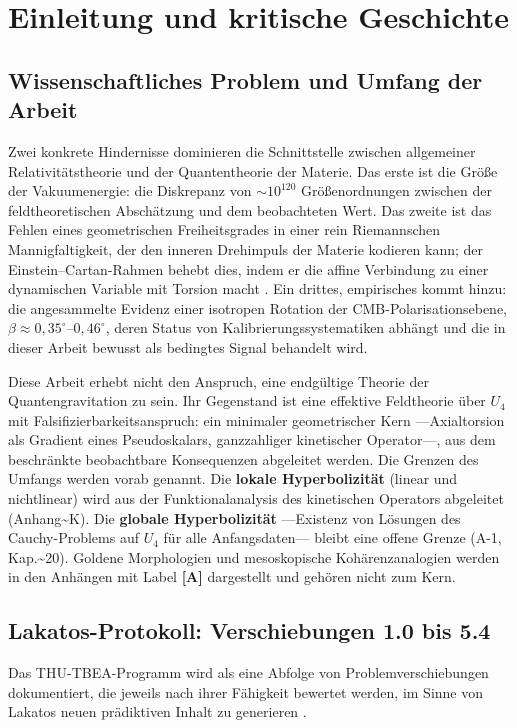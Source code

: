 ﻿\documentclass[11pt,letterpaper]{article}
\begin{document}
\newpage

\section{Einleitung und kritische Geschichte}
\subsection{Wissenschaftliches Problem und Umfang der Arbeit}
Zwei konkrete Hindernisse dominieren die Schnittstelle zwischen allgemeiner Relativitätstheorie und der Quantentheorie der Materie. Das erste ist die Größe der Vakuumenergie: die Diskrepanz von $\sim 10^{120}$ Größenordnungen zwischen der feldtheoretischen Abschätzung und dem beobachteten Wert. Das zweite ist das Fehlen eines geometrischen Freiheitsgrades in einer rein Riemannschen Mannigfaltigkeit, der den inneren Drehimpuls der Materie kodieren kann; der Einstein--Cartan-Rahmen behebt dies, indem er die affine Verbindung zu einer dynamischen Variable mit Torsion macht \cite{Hehl1976}. Ein drittes, empirisches kommt hinzu: die angesammelte Evidenz einer isotropen Rotation der CMB-Polarisationsebene, $\beta \approx 0{,}35^\circ$--$0{,}46^\circ$, deren Status von Kalibrierungssystematiken abhängt und die in dieser Arbeit bewusst als bedingtes Signal behandelt wird.

Diese Arbeit erhebt nicht den Anspruch, eine endgültige Theorie der Quantengravitation zu sein. Ihr Gegenstand ist eine effektive Feldtheorie über $U_4$ mit Falsifizierbarkeitsanspruch: ein minimaler geometrischer Kern ---Axialtorsion als Gradient eines Pseudoskalars, ganzzahliger kinetischer Operator---, aus dem beschränkte beobachtbare Konsequenzen abgeleitet werden. Die Grenzen des Umfangs werden vorab genannt. Die \textbf{lokale Hyperbolizität} (linear und nichtlinear) wird aus der Funktionalanalysis des kinetischen Operators abgeleitet (Anhang\textasciitilde{}K). Die \textbf{globale Hyperbolizität} ---Existenz von Lösungen des Cauchy-Problems auf $U_4$ für alle Anfangsdaten--- bleibt eine offene Grenze (A-1, Kap.\textasciitilde{}20). Goldene Morphologien und mesoskopische Kohärenzanalogien werden in den Anhängen mit Label \textbf{[A]} dargestellt und gehören nicht zum Kern.
\subsection{Lakatos-Protokoll: Verschiebungen 1.0 bis 5.4}
Das THU-TBEA-Programm wird als eine Abfolge von Problemverschiebungen dokumentiert, die jeweils nach ihrer Fähigkeit bewertet werden, im Sinne von Lakatos neuen prädiktiven Inhalt zu generieren \cite{Lakatos1978}.
\end{document}
